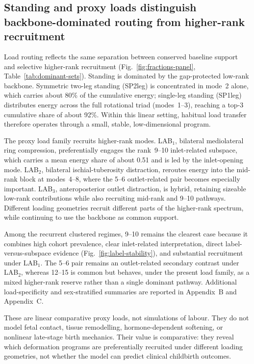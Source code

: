 \documentclass[11pt]{article}
\newcommand{\LABone}{LAB$_1$}
\newcommand{\LABtwo}{LAB$_2$}
\newcommand{\LABthree}{LAB$_3$}
\begin{document}
\subsection{Standing and proxy loads distinguish backbone-dominated routing from higher-rank recruitment}
\label{sec:load-results}

Load routing reflects the same separation between conserved baseline support and selective higher-rank recruitment (Fig.~\ref{fig:fractions-panel}, Table~\ref{tab:dominant-sets}).
Standing is dominated by the gap-protected low-rank backbone.
Symmetric two-leg standing (SP2leg) is concentrated in mode~2 alone, which carries about 80\% of the cumulative energy; single-leg standing (SP1leg) distributes energy across the full rotational triad (modes~1--3), reaching a top-3 cumulative share of about 92\%.
Within this linear setting, habitual load transfer therefore operates through a small, stable, low-dimensional program.

The proxy load family recruits higher-rank modes.
\LABone, bilateral mediolateral ring compression, preferentially engages the rank~9--10 inlet-related subspace, which carries a mean energy share of about 0.51 and is led by the inlet-opening mode.
\LABtwo, bilateral ischial-tuberosity distraction, reroutes energy into the mid-rank block at modes~4--8, where the 5--6 outlet-related pair becomes especially important.
\LABthree, anteroposterior outlet distraction, is hybrid, retaining sizeable low-rank contributions while also recruiting mid-rank and 9--10 pathways.
Different loading geometries recruit different parts of the higher-rank spectrum, while continuing to use the backbone as common support.

Among the recurrent clustered regimes, 9--10 remains the clearest case because it combines high cohort prevalence, clear inlet-related interpretation, direct label-versus-subspace evidence (Fig.~\ref{fig:label-stability}), and substantial recruitment under \LABone.
The 5--6 pair remains an outlet-related secondary contrast under \LABtwo, whereas 12--15 is common but behaves, under the present load family, as a mixed higher-rank reserve rather than a single dominant pathway.
Additional load-specificity and sex-stratified summaries are reported in Appendix~B and Appendix~C.

These are linear comparative proxy loads, not simulations of labour.
They do not model fetal contact, tissue remodelling, hormone-dependent softening, or nonlinear late-stage birth mechanics.
Their value is comparative: they reveal which deformation programs are preferentially recruited under different loading geometries, not whether the model can predict clinical childbirth outcomes.
\end{document}
